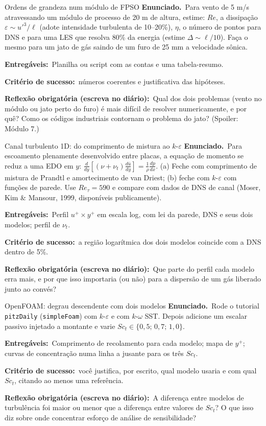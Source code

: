 \documentclass[10pt,a4paper,twocolumn,openany]{report}
\newcommand{\enunciado}{\noindent\textbf{Enunciado.}\ }
\newcommand{\entregaveis}{\par\medskip\noindent\textbf{Entregáveis:}}
\newcommand{\criterio}{\par\medskip\noindent\textbf{Critério de sucesso:}\ }
\newcommand{\reflexao}{\par\medskip\noindent\textbf{Reflexão obrigatória (escreva no diário):}}
\begin{document}
\begin{tarefa}{Ordens de grandeza num módulo de FPSO}
\enunciado Para vento de 5 m/s atravessando um módulo de processo de 20 m de
altura, estime: $Re$, a dissipação $\varepsilon\sim u'^3/\ell$ (adote
intensidade turbulenta de 10--20\%), $\eta$, o número de pontos para DNS e
para uma LES que resolva 80\% da energia (estime $\Delta\sim\ell/10$).
Faça o mesmo para um jato de gás saindo de um furo de 25 mm a velocidade sônica.
\entregaveis\ Planilha ou script com as contas e uma tabela-resumo.
\criterio números coerentes e justificativa das hipóteses.
\reflexao\ Qual dos dois problemas (vento no módulo ou jato perto do furo)
é mais difícil de resolver numericamente, e por quê? Como os códigos
industriais contornam o problema do jato? (Spoiler: Módulo 7.)
\end{tarefa}

\begin{tarefa}{Canal turbulento 1D: do comprimento de mistura ao $k$-$\varepsilon$}
\enunciado Para escoamento plenamente desenvolvido entre placas, a equação
de momento se reduz a uma EDO em $y$:
$\frac{d}{dy}\left[(\nu+\nu_t)\frac{d\bar u}{dy}\right]=\frac{1}{\rho}\frac{dp}{dx}$.
(a) Feche com comprimento de mistura de Prandtl e amortecimento de van
Driest; (b) feche com $k$-$\varepsilon$ com funções de parede. Use
$Re_\tau=590$ e compare com dados de DNS de canal (Moser, Kim \& Mansour,
1999, disponíveis publicamente).
\entregaveis\ Perfil $u^+\times y^+$ em escala log, com lei da parede, DNS
e seus dois modelos; perfil de $\nu_t$.
\criterio a região logarítmica dos dois modelos coincide com a DNS dentro de
5\%.
\reflexao\ Que parte do perfil cada modelo erra mais, e por que isso
importaria (ou não) para a dispersão de um gás liberado junto ao convés?
\end{tarefa}

\begin{tarefa}{OpenFOAM: degrau descendente com dois modelos}
\enunciado Rode o tutorial \texttt{pitzDaily} (\texttt{simpleFoam}) com
$k$-$\varepsilon$ e com $k$-$\omega$ SST. Depois adicione um escalar passivo
injetado a montante e varie $Sc_t\in\{0{,}5;\,0{,}7;\,1{,}0\}$.
\entregaveis\ Comprimento de recolamento para cada modelo; mapa de $y^+$;
curvas de concentração numa linha a jusante para os três $Sc_t$.
\criterio você justifica, por escrito, qual modelo usaria e com qual $Sc_t$,
citando ao menos uma referência.
\reflexao\ A diferença entre modelos de turbulência foi maior ou menor que
a diferença entre valores de $Sc_t$? O que isso diz sobre onde concentrar
esforço de análise de sensibilidade?
\end{tarefa}
\end{document}
